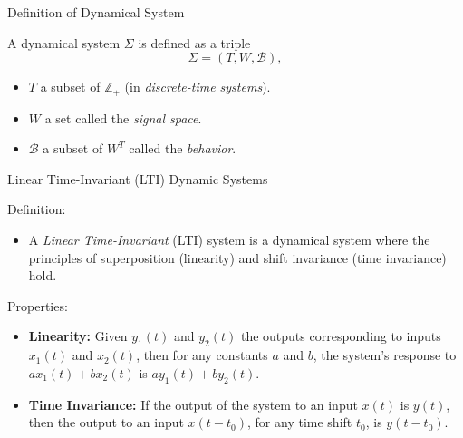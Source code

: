 \documentclass[aspectratio=169,hyperref={pdfpagelabels=false}]{beamer}
\begin{document}
\begin{frame}{Definition of Dynamical System}
  \begin{block}{}
    A dynamical system $\Sigma$ is defined as a triple
  \[
    \Sigma = (T, W, \mathscr{B}),
  \]
  \begin{itemize}
    \item $T$ a subset of $\mathbb{Z}_+$ (in \textit{discrete-time systems}).
    \item $W$ a set called the \textit{signal space}.
    \item $\mathscr{B}$ a subset of $W^T$ called the \textit{behavior}.
  \end{itemize}
  \end{block}
  \let\thefootnote\relax{}
\end{frame}

\begin{frame}{Linear Time-Invariant (LTI) Dynamic Systems}
  \begin{block}{Definition:}
    \begin{itemize}
      \item[] A \textit{Linear Time-Invariant} (LTI) system is a dynamical system where the principles of superposition (linearity) and shift invariance (time invariance) hold.
    \end{itemize}
  \end{block}\pause

\begin{block}{Properties:}
  \begin{itemize}
    \item \textbf{Linearity:} Given $y_1(t)$ and $y_2(t)$ the outputs corresponding to inputs $x_1(t)$ and $x_2(t)$, then for any constants $a$ and $b$, the system's response to $ax_1(t) + bx_2(t)$ is $ay_1(t) + by_2(t)$.
    \item \textbf{Time Invariance:} If the output of the system to an input $x(t)$ is $y(t)$, then the output to an input $x(t - t_0)$, for any time shift $t_0$, is $y(t - t_0)$.
  \end{itemize}
\end{block}
\end{frame}
\end{document}
